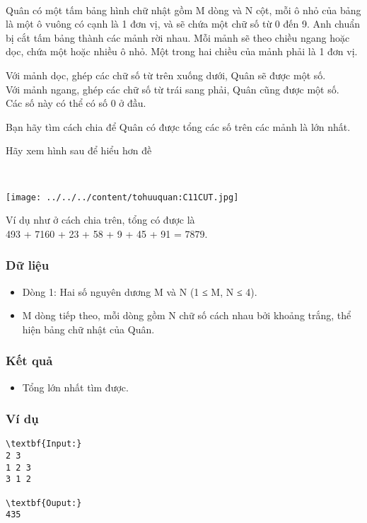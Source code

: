 

 

Quân có một tấm bảng hình chữ nhật gồm M dòng và N cột, mỗi ô nhỏ của bảng là một ô vuông có cạnh là 1 đơn vị, và sẽ chứa một chữ số từ 0 đến 9. Anh chuẩn bị cắt tấm bảng thành các mảnh rời nhau. Mỗi mảnh sẽ theo chiều ngang hoặc dọc, chứa một hoặc nhiều ô nhỏ. Một trong hai chiều của mảnh phải là 1 đơn vị.

Với mảnh dọc, ghép các chữ số từ trên xuống dưới, Quân sẽ được một số.
\\Với mảnh ngang, ghép các chữ số từ trái sang phải, Quân cũng được một số.
\\Các số này có thể có số 0 ở đầu.

Bạn hãy tìm cách chia để Quân có được tổng các số trên các mảnh là lớn nhất.

Hãy xem hình sau để hiểu hơn đề

 


\texttt{[image: ../../../content/tohuuquan:C11CUT.jpg]}

Ví dụ như ở cách chia trên, tổng có được là
\\493 + 7160 + 23 + 58 + 9 + 45 + 91 = 7879.

\subsubsection{Dữ liệu}
\begin{itemize}
	\item Dòng 1: Hai số nguyên dương M và N (1 ≤ M, N ≤ 4).
	\item M dòng tiếp theo, mỗi dòng gồm N chữ số cách nhau bởi khoảng trắng, thể hiện bảng chữ nhật của Quân.
\end{itemize}

\subsubsection{Kết quả}
\begin{itemize}
	\item Tổng lớn nhất tìm được.
\end{itemize}

\subsubsection{Ví dụ}
\begin{verbatim}
\textbf{Input:}
2 3
1 2 3
3 1 2

\textbf{Ouput:}
435
\end{verbatim}